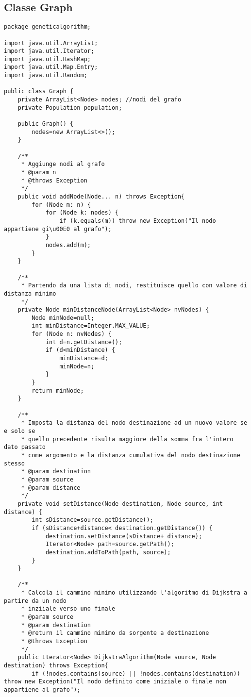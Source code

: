 \subsection{Classe Graph}
\begin{lstlisting}[style=Java]
package geneticalgorithm;

import java.util.ArrayList;
import java.util.Iterator;
import java.util.HashMap;
import java.util.Map.Entry;
import java.util.Random;

public class Graph {
	private ArrayList<Node> nodes; //nodi del grafo
	private Population population;
	
	public Graph() {
		nodes=new ArrayList<>();
	}
	
	/**
	 * Aggiunge nodi al grafo
	 * @param n
	 * @throws Exception
	 */
	public void addNode(Node... n) throws Exception{
		for (Node m: n) {
			for (Node k: nodes) {
				if (k.equals(m)) throw new Exception("Il nodo appartiene gi\u00E0 al grafo");
			}
			nodes.add(m);
		}
	}
	
	/**
	 * Partendo da una lista di nodi, restituisce quello con valore di distanza minimo
	 */
	private Node minDistanceNode(ArrayList<Node> nvNodes) {
		Node minNode=null;
		int minDistance=Integer.MAX_VALUE;
		for (Node n: nvNodes) {
			int d=n.getDistance();
			if (d<minDistance) {
				minDistance=d;
				minNode=n;
			}
		}
		return minNode;
	}
	
	/**
	 * Imposta la distanza del nodo destinazione ad un nuovo valore se e solo se
	 * quello precedente risulta maggiore della somma fra l'intero dato passato
	 * come argomento e la distanza cumulativa del nodo destinazione stesso
	 * @param destination
	 * @param source
	 * @param distance
	 */
	private void setDistance(Node destination, Node source, int distance) {
		int sDistance=source.getDistance();
		if (sDistance+distance< destination.getDistance()) {
			destination.setDistance(sDistance+ distance);
			Iterator<Node> path=source.getPath();
			destination.addToPath(path, source);
		}
	}
	
	/**
	 * Calcola il cammino minimo utilizzando l'algoritmo di Dijkstra a partire da un nodo
	 * inziiale verso uno finale
	 * @param source
	 * @param destination
	 * @return il cammino minimo da sorgente a destinazione
	 * @throws Exception
	 */
	public Iterator<Node> DijkstraAlgorithm(Node source, Node destination) throws Exception{
		if (!nodes.contains(source) || !nodes.contains(destination)) throw new Exception("Il nodo definito come iniziale o finale non appartiene al grafo");
		

\end{lstlisting}
